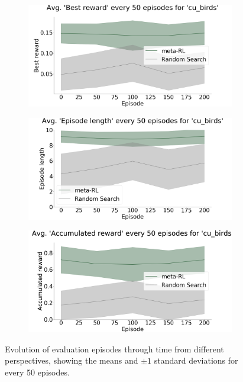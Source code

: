 \begin{figure}[ht]
\begin{subfigure}{.33\textwidth}
  \caption{}
\label{fig:results:exp2:evolution:c}
\end{subfigure}
\begin{subfigure}{.33\textwidth}
  \centering
      \includegraphics[width=\linewidth]{imgs/chained/average-best_reward-cu_birds.png}
  \caption{} 
\label{fig:results:exp2:evolution:d}
\end{subfigure}%
\begin{subfigure}{.33\textwidth}
  \centering
      \includegraphics[width=\linewidth]{imgs/chained/average-ep_length-cu_birds.png}
  \caption{}
\label{fig:results:exp2:evolution:e}
\end{subfigure}%
\begin{subfigure}{.33\textwidth}
  \centering
      \includegraphics[width=\linewidth]{imgs/chained/average-acc_reward-cu_birds.png}
  \caption{} 
\label{fig:results:exp2:evolution:f}
\end{subfigure}
\caption{Evolution of evaluation episodes through time from different perspectives, showing the means and $\pm 1$ standard deviations for every 50 episodes.}
\label{fig:results:exp2:evolution}
\vspace{-0.5cm}
\end{figure}


